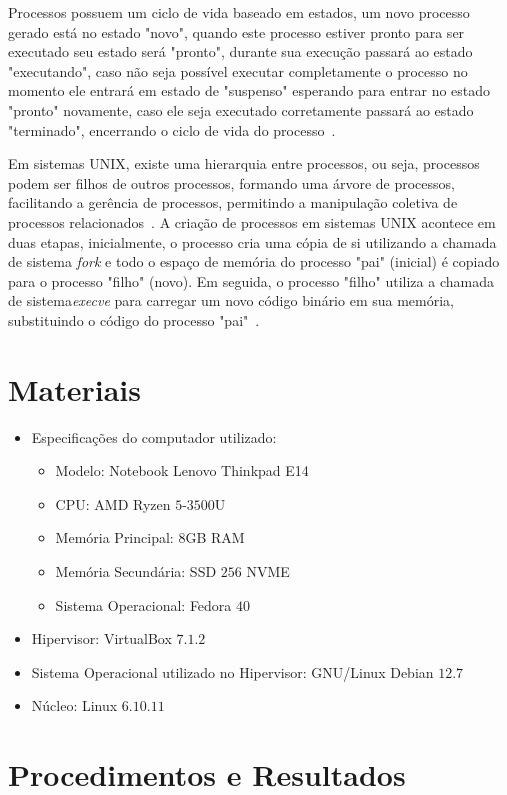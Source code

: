 \documentclass[
	12pt,				%
	oneside,   	        %
	a4paper,			%
	english,			%
	french,				%
	spanish,			%
	brazil,				%
	]{pacotes/abntex2}
\begin{document}
Processos possuem um ciclo de vida baseado em estados, um novo processo gerado está no estado "novo", quando este processo estiver pronto para ser executado seu estado será "pronto", durante sua execução passará ao estado "executando", caso não seja possível executar completamente o processo no momento ele entrará em estado de "suspenso" esperando para entrar no estado "pronto" novamente, caso ele seja executado corretamente passará ao estado "terminado", encerrando o ciclo de vida do processo~\cite{maziero2019}.

Em sistemas UNIX, existe uma hierarquia entre processos, ou seja, processos podem ser filhos de outros processos, formando uma árvore de processos, facilitando a gerência de processos, permitindo a manipulação coletiva de processos relacionados~\cite{maziero2019}. A criação de processos em sistemas UNIX acontece em duas etapas, inicialmente, o processo cria uma cópia de si utilizando a chamada de sistema \textit{fork} e todo o espaço de memória do processo "pai" (inicial) é copiado para o processo "filho" (novo). Em seguida, o processo "filho" utiliza a chamada de sistema\textit{execve} para carregar um novo código binário em sua memória, substituindo o código do processo "pai"~\cite{maziero2019}.

\section{Materiais}
\label{sec:materiais}

\begin{itemize}
  \item Especificações do computador utilizado:
  \begin{itemize}
    \item Modelo: Notebook Lenovo Thinkpad E14
    \item CPU: AMD Ryzen $5$-$3500$U
    \item Memória Principal: $8$GB RAM
    \item Memória Secundária: SSD $256$ NVME
    \item Sistema Operacional: Fedora $40$
  \end{itemize}
  \item Hipervisor: VirtualBox $7.1.2$
  \item Sistema Operacional utilizado no Hipervisor: GNU/Linux Debian $12.7$
  \item Núcleo: Linux $6.10.11$
\end{itemize}

\section{Procedimentos e Resultados}
\label{sec:procedimentos}
\end{document}
